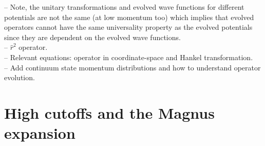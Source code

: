 \documentclass[preprintnumbers,floatfix,aps,prc,preprint,nofootinbib]{revtex4-1}
\begin{document}
%
-- Note, the unitary transformations and evolved wave functions for different potentials are not the same (at low momentum too) which implies that evolved operators cannot have the same universality property as the evolved potentials since they are dependent on the evolved wave functions.
\\
-- $\hat{r}^2$ operator.
\\
-- Relevant equations: operator in coordinate-space and Hankel transformation.
\\
-- Add continuum state momentum distributions and how to understand operator evolution.


\section{High cutoffs and the Magnus expansion}
\label{sec:magnus_expansion}
\end{document}
